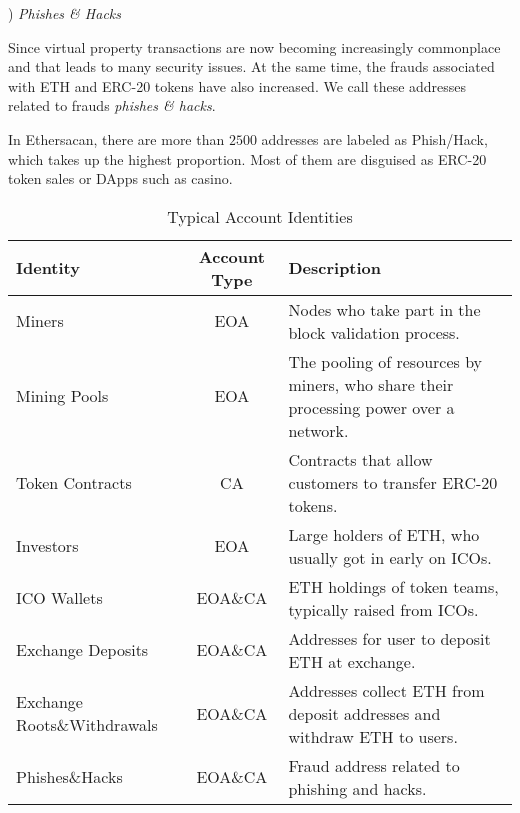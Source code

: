 ) \emph{Phishes \& Hacks}

Since virtual property transactions are now becoming increasingly commonplace and that leads to many security issues. At the same time, the frauds associated with ETH and ERC-20 tokens have also increased. We call these addresses related to frauds \emph{phishes \& hacks}.

 In Ethersacan, there are more than $2500$ addresses are labeled as Phish/Hack, which takes up the highest proportion. Most of them are disguised as ERC-20 token sales or DApps such as casino. 

\begin{table}[htbp]
\caption{Typical Account Identities}
\begin{center}
\begin{tabular}{|p{2.1cm}|c|p{3.9cm}|}
\hline
\textbf{Identity} & \textbf{Account Type}& \textbf{Description} \\
\hline
Miners & EOA & Nodes who take part in the block validation process. \\ \hline
Mining Pools & EOA & The pooling of resources by miners, who share their processing power over a network.\\ \hline
Token Contracts & CA & Contracts that allow customers to transfer ERC-20 tokens. \\ \hline
Investors & EOA & Large holders of ETH, who usually got in early on ICOs. \\ \hline
ICO Wallets & EOA\&CA & ETH holdings of token teams, typically raised from ICOs. \\ \hline
Exchange Deposits & EOA\&CA & Addresses for user to deposit ETH at exchange. \\ \hline
Exchange Roots\&Withdrawals & EOA\&CA & Addresses collect ETH from deposit addresses and withdraw ETH to users. \\ \hline
Phishes\&Hacks & EOA\&CA & Fraud address related to phishing and hacks. \\ \hline
\end{tabular}
\label{tab1}
\end{center}
\end{table}









